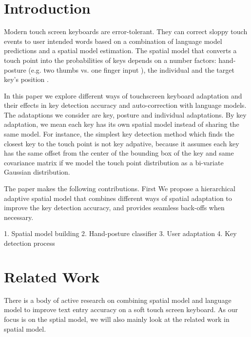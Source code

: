 \documentclass{sigchi}
\begin{document}

\section{Introduction}
Modern touch screen keyboards are error-tolerant. They can correct sloppy touch
events to user intended words based on a combination of language model predictions and a spatial model estimation. 
The spatial model that converts a touch point into the probabilities of keys 
depends on a number factors: hand-posture (e.g. two thumbs vs. one finger input \cite{Azenkot:2012}), 
the individual \cite{Findlater:2012} and the target key's position \cite{Azenkot:2012}.

In this paper we explore different ways of touchscreen keyboard adaptation and
their effects in key detection accuracy and auto-correction with language
models. The adataptions we consider are key, posture and individual adaptations. By key adaptation,
we mean each key has its own spatial model instead of sharing the same model. For instance, 
the simplest key detection method which finds the closest key to the touch point is not key adpative,
because it assumes each key has the same offset from the center of the bounding box 
of the key and same covariance matrix if
we model the touch point distribution as a bi-variate Gaussian distribution.  

The paper makes the following contributions. First
We propose a hierarchical adaptive spatial model that combines different
ways of spatial adaptation to improve the key detection accuracy, and provides seamless back-offs when necessary.

 1. Spatial model building
2. Hand-posture classifier
3. User adaptation
4. Key detection process

\section{Related Work}
There is a body of active research on combining spatial model and language model
to improve text entry accuracy on a soft touch screen keyboard. As our focus is on the 
sptial model, we will also mainly look at the related work in spatial model.    
\end{document}
